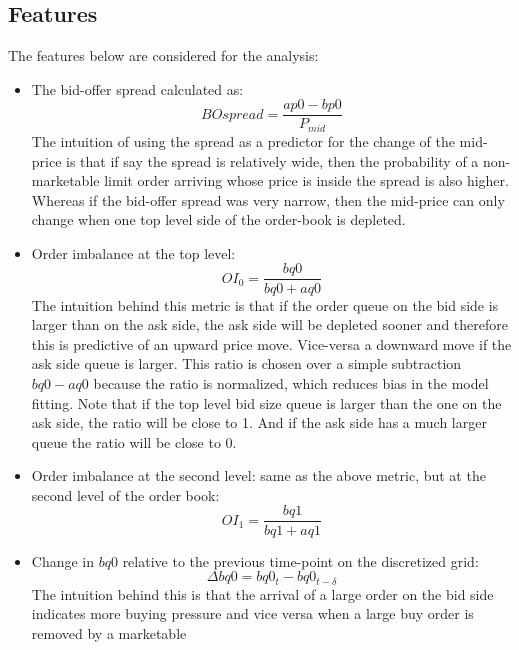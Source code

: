 \documentclass[english, 11pt, a4paper]{article}
\begin{document}
\subsection{Features}
The features below are considered for the analysis:
\begin{itemize}
    \item The bid-offer spread calculated as:
        \begin{equation}
            BOspread = \frac{ap0 - bp0}{P_{mid}}
        \end{equation}
    The intuition of using the spread as a predictor for the change of the mid-price is that if say
    the spread is relatively wide, then the probability of a non-marketable limit order
    arriving whose price is inside the spread is also higher. Whereas if the bid-offer spread was very
    narrow, then the mid-price can only change when one top level side of the order-book is depleted.
    \item Order imbalance at the top level: 
        \begin{equation}
            OI_0 = \frac{bq0}{bq0+aq0} 
        \end{equation}
    The intuition behind this metric is that if the order queue on the bid side is larger than on the
    ask side, the ask side will be depleted sooner and therefore this is predictive of an upward
    price move. Vice-versa a downward move if the ask side queue is larger. This ratio is chosen over a simple subtraction $bq0-aq0$ because the ratio is normalized, which
    reduces bias in the model fitting. Note that if the top level bid size queue is larger than the
    one on the ask side, the ratio will be close to 1. And if the ask side has a much larger
    queue the ratio will be close to 0.
    \item Order imbalance at the second level: same as the above metric, but at the second level of
        the order book:
        \begin{equation}
            OI_1 = \frac{bq1}{bq1+aq1} 
        \end{equation}
    \item Change in $bq0$ relative to the previous time-point on the discretized grid:
        \begin{equation}
            \Delta bq0 = bq0_{t} - bq0_{t-\delta} 
        \end{equation}
        The intuition behind this is that the arrival of a large order on the bid side indicates
        more buying pressure and vice versa when a large buy order is removed by a marketable

\end{itemize}
\end{document}
